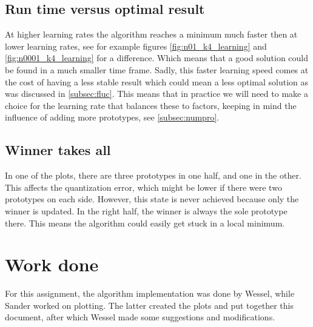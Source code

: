 \documentclass[10pt,a4paper]{article}
\begin{document}
\subsection{Run time versus optimal result}
At higher learning rates the algorithm reaches a minimum much faster then at lower learning rates, see for example figures \ref{fig:n01_k4_learning} and \ref{fig:n0001_k4_learning} for a difference. Which means that a good solution could be found in a much smaller time frame. Sadly, this faster learning speed comes at the cost of having a less stable result which could mean a less optimal solution as was discussed in \ref{subsec:fluc}. This means that in practice we will need to make a choice for the learning rate that balances these to factors, keeping in mind the influence of adding more prototypes, see \ref{subsec:numpro}.

\subsection{Winner takes all}
In one of the plots, there are three prototypes in one half, and one in the other. This affects the quantization error, which might be lower if there were two prototypes on each side. However, this state is never achieved because only the winner is updated. In the right half, the winner is always the sole prototype there. This means the algorithm could easily get stuck in a local minimum.

\section{Work done}
For this assignment, the algorithm implementation was done by Wessel, while Sander worked on plotting. The latter created the plots and put together this document, after which Wessel made some suggestions and modifications.
\end{document}
